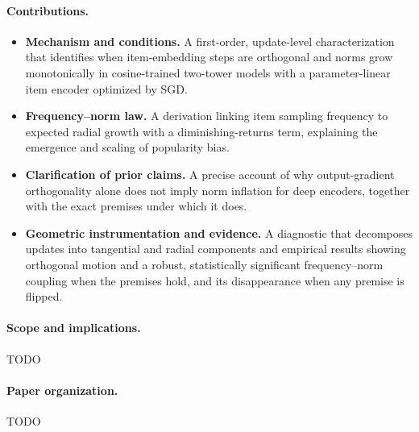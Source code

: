 \paragraph{Contributions.}
\begin{itemize}
    \item \textbf{Mechanism and conditions.} A first-order, update-level characterization that identifies when item-embedding steps are orthogonal and norms grow monotonically in cosine-trained two-tower models with a parameter-linear item encoder optimized by SGD.
    \item \textbf{Frequency–norm law.} A derivation linking item sampling frequency to expected radial growth with a diminishing-returns term, explaining the emergence and scaling of popularity bias.
    \item \textbf{Clarification of prior claims.} A precise account of why output-gradient orthogonality alone does not imply norm inflation for deep encoders, together with the exact premises under which it does.
    \item \textbf{Geometric instrumentation and evidence.} A diagnostic that decomposes updates into tangential and radial components and empirical results showing orthogonal motion and a robust, statistically significant frequency–norm coupling when the premises hold, and its disappearance when any premise is flipped.
\end{itemize}

\paragraph{Scope and implications.} TODO

\paragraph{Paper organization.} TODO